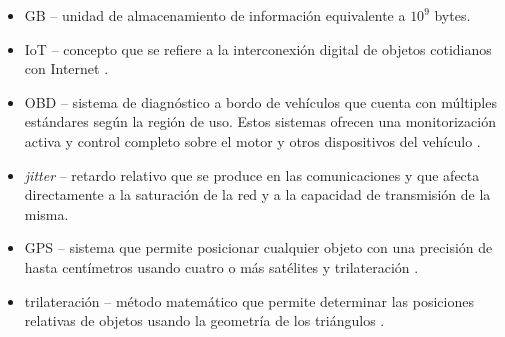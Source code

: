 \begin{acronym}
\end{acronym}

\begin{itemize}
  \item \ac{GB} -- unidad de almacenamiento de información equivalente a $10^9$ bytes.
  \item \ac{IoT} -- concepto que se refiere a la interconexión digital de objetos 
        cotidianos con Internet \cite{InternetCosas2021}.
  \item \ac{OBD} -- sistema de diagnóstico a bordo de vehículos que
        cuenta con múltiples estándares según la región de uso. Estos
        sistemas ofrecen una monitorización activa y control completo
        sobre el motor y otros dispositivos del vehículo \cite{OBD2021}.
  \item \textit{jitter} -- retardo relativo que se produce en las comunicaciones
        y que afecta directamente a la saturación de la red y a la capacidad de
        transmisión de la misma.
  \item \ac{GPS} -- sistema que permite posicionar cualquier objeto con una 
        precisión de hasta centímetros usando cuatro o más satélites y 
        trilateración \cite{GPS2021}.
  \item trilateración -- método matemático que permite determinar las posiciones
        relativas de objetos usando la geometría de los triángulos \cite{Trilateracion2021}.
\end{itemize}